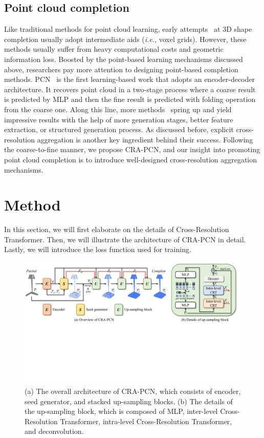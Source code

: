 \documentclass[letterpaper]{article} %
\begin{document}
\subsection{Point cloud completion}
Like traditional methods for point cloud learning, early attempts~\cite{choy20163d, girdhar2016learning, han2017high} at 3D shape completion usually adopt intermediate aids ({\em i.e.}, voxel grids). 
However, these methods usually suffer from heavy computational costs and geometric information loss.
Boosted by the point-based learning mechanisms discussed above, researchers pay more attention to designing point-based completion methods. 
PCN~\cite{yuan2018pcn} is the first learning-based work that adopts an encoder-decoder architecture.
It recovers point cloud in a two-stage process where a coarse result is predicted by MLP and then the fine result is predicted with folding operation~\cite{yang2018foldingnet} from the coarse one.
Along this line, more methods~\cite{xiang2021snowflakenet, zhou2022seedformer,yan2022fbnet,tang2022lake,wang2022learning, li2023proxyformer, chen2023anchorformer} spring up and 
yield impressive results with the help of  more generation stages, better feature extraction, or structured 
generation process.
As discussed before, explicit cross-resolution aggregation is another key ingredient behind their success.
Following the coarse-to-fine manner, we propose CRA-PCN, and our insight into promoting point cloud completion is to introduce well-designed cross-resolution aggregation mechanisms.

\section {Method}
In this section, we will first elaborate on the details of Cross-Resolution Transformer. 
Then, we will illustrate the architecture of CRA-PCN in detail.
Lastly, we will introduce the loss function used for training.

\begin{figure}[t]
\begin{center}
\includegraphics[width=1.0\linewidth]{Figures/arc.pdf}
\end{center}
\caption{
(a) The overall architecture of CRA-PCN, which consists of encoder, seed generator, and stacked up-sampling blocks. 
(b) The details of the up-sampling block, which is composed of MLP, inter-level Cross-Resolution Transformer, intra-level Cross-Resolution Transformer, and deconvolution.}
\label{fig:arc}
\end{figure}
\end{document}
